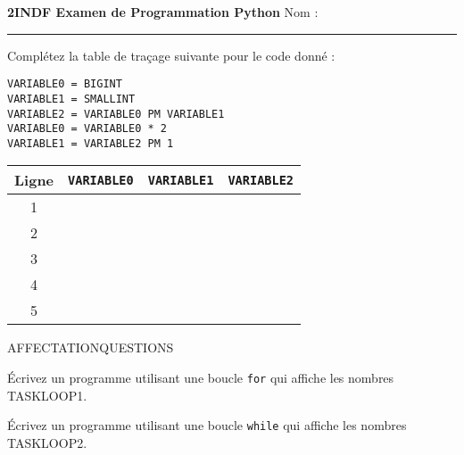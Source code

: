 \documentclass[12pt]{exam}
\begin{document}
\begin{center}
\textbf{2INDF Examen de Programmation Python} \hfill Nom : \rule{6cm}{0.4pt}
\end{center}

\begin{questions}

\question[5] Complétez la table de traçage suivante pour le code donné :

\hfill
\begin{minipage}[t]{0.2\textwidth}
\vspace{0mm}
\begin{lstlisting}
VARIABLE0 = BIGINT
VARIABLE1 = SMALLINT
VARIABLE2 = VARIABLE0 PM VARIABLE1
VARIABLE0 = VARIABLE0 * 2
VARIABLE1 = VARIABLE2 PM 1
\end{lstlisting}
\end{minipage}
\hfill
\begin{minipage}[t]{0.4\textwidth}
\vspace{-4mm}
    \begin{tabular}{|c|p{5mm}|p{5mm}|p{5mm}|}
        \hline
        {\footnotesize Ligne} & \texttt{VARIABLE0} & \texttt{VARIABLE1} & \texttt{VARIABLE2} \\
        \hline
        1 &  &  &  \\
        \hline
        2 &  &  &  \\
        \hline
        3 &  &  &  \\
        \hline
        4 &  &  &  \\
        \hline
        5 &  &  &  \\
        \hline
    \end{tabular}
\end{minipage}

AFFECTATIONQUESTIONS

\question[5] Écrivez un programme utilisant une boucle \texttt{for} qui affiche les nombres TASKLOOP1.
\fillwithgrid{24mm}

\question[5] Écrivez un programme utilisant une boucle \texttt{while} qui affiche les nombres TASKLOOP2.
\fillwithgrid{32mm}

\end{questions}
\end{document}

